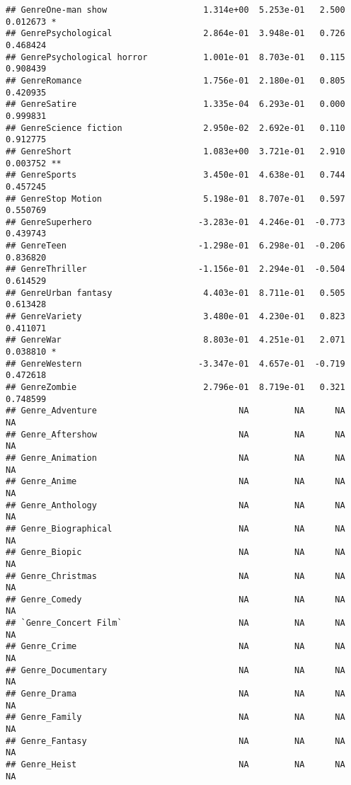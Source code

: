 \documentclass[
]{article}
\begin{document}
\begin{verbatim}
## GenreOne-man show                   1.314e+00  5.253e-01   2.500 0.012673 *  
## GenrePsychological                  2.864e-01  3.948e-01   0.726 0.468424    
## GenrePsychological horror           1.001e-01  8.703e-01   0.115 0.908439    
## GenreRomance                        1.756e-01  2.180e-01   0.805 0.420935    
## GenreSatire                         1.335e-04  6.293e-01   0.000 0.999831    
## GenreScience fiction                2.950e-02  2.692e-01   0.110 0.912775    
## GenreShort                          1.083e+00  3.721e-01   2.910 0.003752 ** 
## GenreSports                         3.450e-01  4.638e-01   0.744 0.457245    
## GenreStop Motion                    5.198e-01  8.707e-01   0.597 0.550769    
## GenreSuperhero                     -3.283e-01  4.246e-01  -0.773 0.439743    
## GenreTeen                          -1.298e-01  6.298e-01  -0.206 0.836820    
## GenreThriller                      -1.156e-01  2.294e-01  -0.504 0.614529    
## GenreUrban fantasy                  4.403e-01  8.711e-01   0.505 0.613428    
## GenreVariety                        3.480e-01  4.230e-01   0.823 0.411071    
## GenreWar                            8.803e-01  4.251e-01   2.071 0.038810 *  
## GenreWestern                       -3.347e-01  4.657e-01  -0.719 0.472618    
## GenreZombie                         2.796e-01  8.719e-01   0.321 0.748599    
## Genre_Adventure                            NA         NA      NA       NA    
## Genre_Aftershow                            NA         NA      NA       NA    
## Genre_Animation                            NA         NA      NA       NA    
## Genre_Anime                                NA         NA      NA       NA    
## Genre_Anthology                            NA         NA      NA       NA    
## Genre_Biographical                         NA         NA      NA       NA    
## Genre_Biopic                               NA         NA      NA       NA    
## Genre_Christmas                            NA         NA      NA       NA    
## Genre_Comedy                               NA         NA      NA       NA    
## `Genre_Concert Film`                       NA         NA      NA       NA    
## Genre_Crime                                NA         NA      NA       NA    
## Genre_Documentary                          NA         NA      NA       NA    
## Genre_Drama                                NA         NA      NA       NA    
## Genre_Family                               NA         NA      NA       NA    
## Genre_Fantasy                              NA         NA      NA       NA    
## Genre_Heist                                NA         NA      NA       NA    

\end{verbatim}
\end{document}
